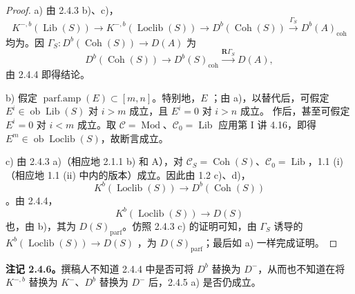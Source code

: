 \begin{proof}
a) 由 2.4.3 b)、c)，
\[
K^{-,b}(\operatorname{Lib}(S))\longrightarrow K^{-,b}(\operatorname{Loclib}(S))\longrightarrow D^b(\operatorname{Coh}(S))\xrightarrow{\Gamma_S}D^b(A)_{\mathrm{coh}}
\]
均为。因 $\Gamma_S:D^b(\operatorname{Coh}(S))\to D(A)$ 为
\[
D^b(\operatorname{Coh}(S))\longrightarrow D^b(S)_{\mathrm{coh}}\xrightarrow{\mathbf R\Gamma_S}D(A),
\]
由 2.4.4 即得结论。

b) 假定 $\operatorname{parf.amp}(E)\subset[m,n]$。特别地，$E$ ；由 a)，以替代后，可假定 $E^i\in\operatorname{ob}\operatorname{Lib}(S)$ 对 $i>m$ 成立，且 $E^i=0$ 对 $i>n$ 成立。
作后，甚至可假定 $E^i=0$ 对 $i<m$ 成立。取 $\mathcal C=\operatorname{Mod}$、$\mathcal C_0=\operatorname{Lib}$ 应用第 I 讲 4.16，即得 $E^m\in\operatorname{ob}\operatorname{Loclib}(S)$，故断言成立。

c) 由 2.4.3 a)（相应地 2.1.1 b) 和 A），对 $\mathcal C_S=\operatorname{Coh}(S)$、$\mathcal C_0=\operatorname{Lib}$，1.1 (i)（相应地 1.1 (ii) 中内的版本）成立。因此由 1.2 c)、d)，
\[
K^b(\operatorname{Loclib}(S))\longrightarrow D^b(\operatorname{Coh}(S))
\]
。由 2.4.4，
\[
K^b(\operatorname{Loclib}(S))\longrightarrow D(S)
\]
也，由 b)，其为 $D(S)_{\mathrm{parf}}$。仿照 2.4.3 c) 的证明可知，由 $\Gamma_S$ 诱导的 $K^b(\operatorname{Loclib}(S))\to D(S)$ ，为 $D(S)_{\mathrm{parf}}$；最后如 a) 一样完成证明。
\end{proof}
\textbf{注记 2.4.6。}撰稿人不知道 2.4.4 中是否可将 $D^b$ 替换为 $D^-$，从而也不知道在将 $K^{-,b}$ 替换为 $K^-$、$D^b$ 替换为 $D^-$ 后，2.4.5 a) 是否仍成立。

